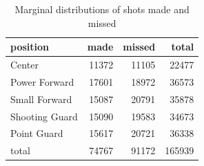 \documentclass[letterpaper, landscape]{exam}
\begin{document}
\begin{questions}
      \begin{solution}
        
        \begin{table}[H]
          \centering
          \begin{tabular}{lrrr}
            \toprule
            position       & made  & missed & total \\
            \midrule
            Center         & 11372 & 11105  & 22477 \\
            Power Forward  & 17601 & 18972  & 36573 \\
            Small Forward  & 15087 & 20791  & 35878 \\
            Shooting Guard & 15090 & 19583 & 34673 \\
            Point Guard    & 15617 & 20721 & 36338 \\
            \midrule
            total          & 74767 & 91172 & 165939 \\
            \bottomrule
          \end{tabular}
          \caption{Marginal distributions of shots made and missed}
          \label{tab:marginal_shots}
        \end{table}

      \end{solution}

      \question 
        \label{q:sbp.last}
\end{questions}
\end{document}
